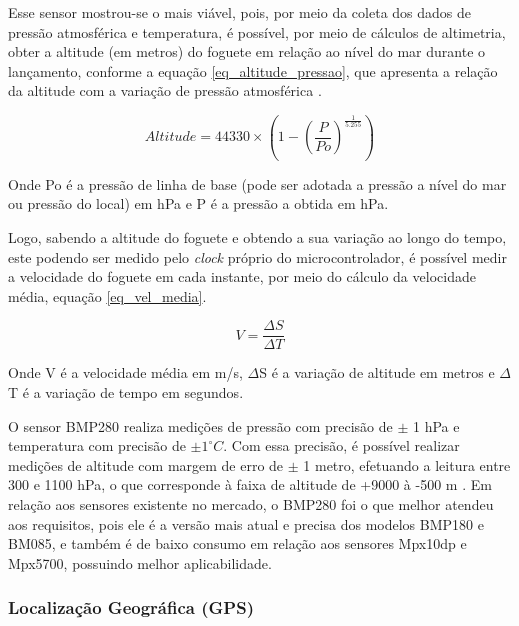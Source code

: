 Esse sensor mostrou-se o mais viável, pois, por meio da coleta dos dados de pressão atmosférica e temperatura, é possível, por meio de cálculos de altimetria, obter a altitude (em metros) do foguete em relação ao nível do mar durante o lançamento, conforme a equação \ref{eq_altitude_pressao}, que apresenta a relação da altitude com a variação de pressão atmosférica \cite{grusin_Tutorial_2018}.

    

\begin{equation}
Altitude = 44330 \times (1 - (\frac{P}{Po})^{\frac{1}{5.255}})
\label{eq_altitude_pressao}
\end{equation}


Onde Po é a pressão de linha de base (pode ser adotada a pressão a nível do mar ou pressão do local) em hPa e P é a pressão a obtida em hPa.

Logo, sabendo a altitude do foguete e obtendo a sua variação ao longo do tempo, este podendo ser medido pelo  \textit{clock} próprio do microcontrolador, é possível medir a velocidade do foguete em cada instante, por meio do cálculo da velocidade média, equação \ref{eq_vel_media}.

\begin{center}
\begin{equation}
\label{eq_vel_media}
V = \frac{\Delta S} {\Delta T}
\end{equation}
\end{center}

Onde V é a velocidade média em m/s, $\Delta$S é a variação de altitude em metros e $\Delta$T é a variação de tempo em segundos.

O sensor BMP280 realiza medições de pressão com precisão de $\pm$ 1 hPa e temperatura com precisão de $\pm 1 ^\circ C $. Com essa precisão, é possível realizar medições de altitude com margem de erro de  $\pm$ 1 metro, efetuando a leitura entre 300 e 1100 hPa, o que corresponde à faixa de altitude de +9000 à -500 m \cite{cia_BMP280_2017}.
Em relação aos sensores existente no mercado, o BMP280 foi o que melhor atendeu aos requisitos, pois ele é a versão mais atual e precisa dos modelos BMP180 e BM085, e também é de baixo consumo em relação aos sensores Mpx10dp e Mpx5700, possuindo melhor aplicabilidade.

\subsubsection{Localização Geográfica (GPS)}

